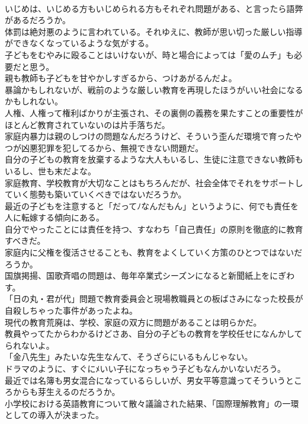 \documentclass[8pt]{extreport}
\begin{document}
\begin{CJK}{UTF8}{min}
\\	いじめは、いじめる方もいじめられる方もそれぞれ問題がある、と言ったら語弊があるだろうか。	
\\	体罰は絶対悪のように言われている。それゆえに、教師が思い切った厳しい指導ができなくなっているような気がする。	
\\	子どもをむやみに殴ることはいけないが、時と場合によっては「愛のムチ」も必要だと思う。	
\\	親も教師も子どもを甘やかしすぎるから、つけあがるんだよ。	
\\	暴論かもしれないが、戦前のような厳しい教育を再現したほうがいい社会になるかもしれない。	
\\	人権、人権って権利ばかりが主張され、その裏側の義務を果たすことの重要性がほとんど教育されていないのは片手落ちだ。	
\\	家庭内暴力は親のしつけの問題なんだろうけど、そういう歪んだ環境で育ったやつが凶悪犯罪を犯してるから、無視できない問題だ。	
\\	自分の子どもの教育を放棄するような大人もいるし、生徒に注意できない教師もいるし、世も末だよな。	
\\	家庭教育、学校教育が大切なことはもちろんだが、社会全体でそれをサポートしていく態勢も築いていくべきではないだろうか。	
\\	最近の子どもを注意すると「だってﾉなんだもん」というように、何でも責任を人に転嫁する傾向にある。	
\\	自分でやったことには責任を持つ、すなわち「自己責任」の原則を徹底的に教育すべきだ。	
\\	家庭内に父権を復活させることも、教育をよくしていく方策のひとつではないだろうか。	
\\	国旗掲揚、国歌斉唱の問題は、毎年卒業式シーズンになると新聞紙上をにぎわす。	
\\	「日の丸・君が代」問題で教育委員会と現場教職員との板ばさみになった校長が自殺しちゃった事件があったよね。	
\\	現代の教育荒廃は、学校、家庭の双方に問題があることは明らかだ。	
\\	教員やってたからわかるけどさあ、自分の子どもの教育を学校任せになんかしてられないよ。	
\\	「金八先生」みたいな先生なんて、そうざらにいるもんじゃない。	
\\	ドラマのように、すぐにﾒいい子ﾓになっちゃう子どもなんかいないだろう。	
\\	最近では名簿も男女混合になっているらしいが、男女平等意識ってそういうところからも芽生えるのだろうか。	
\\	小学校における英語教育について散々議論された結果、「国際理解教育」の一環としての導入が決まった。	

\end{CJK}
\end{document}
